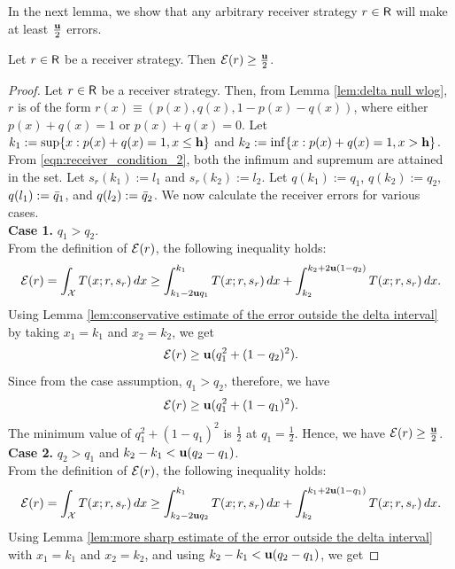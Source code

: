 In the next lemma, we show that any arbitrary receiver strategy $r \in \mathsf{R}$ will make at least $\frac{\mathbf{u}}{2}$ errors.

\begin{lem}\label{lem:Error more than half}
    Let $r \in \mathsf{R}$ be a receiver strategy. Then $\mathcal{E}(r) \geq \frac{\mathbf{u}}{2}$.
\end{lem}
\begin{proof}\label{proof:Error more than half}
    Let $r \in \mathsf{R}$ be a receiver strategy. Then, from Lemma \ref{lem:delta null wlog}, $r$ is of the form $r(x) \equiv (p(x), q(x), 1 - p(x) - q(x))$, where either $p(x) + q(x) = 1$ or $p(x) + q(x) = 0$. Let $k_1 := \sup\{x : p(x) + q(x) = 1, x \leq \mathbf{h}\}$ and $k_2 := \inf\{x : p(x) + q(x) = 1, x > \mathbf{h}\}$. From \eqref{eqn:receiver_condition_2}, both the infimum and supremum are attained in the set. Let $s_r(k_1) := l_1$ and $s_r(k_2) := l_2$. Let $q(k_1) := q_1$, $q(k_2) := q_2$, $q(l_1) := \bar{q}_1$, and $q(l_2) := \bar{q}_2$. We now calculate the receiver errors for various cases.\\
    \textbf{Case 1. }{$q_1 > q_2$.} \\
        From the definition of $\mathcal{E}(r)$, the following inequality holds:
        \[
        \mathcal{E}(r) = \int_{\mathcal{X}} T(x; r, s_r) \, dx \geq \int_{k_1 - 2\mathbf{u} q_1}^{k_1} T(x; r, s_r) \, dx + \int_{k_2}^{k_2 + 2\mathbf{u}(1 - q_2)} T(x; r, s_r) \, dx.
        \]
        Using Lemma \ref{lem:conservative estimate of the error outside the delta interval} by taking $x_1 = k_1$ and $x_2 = k_2$, we get
        \[
        \mathcal{E}(r) \geq \mathbf{u}(q_1^2 + (1 - q_2)^2).
        \]
        Since from the case assumption, $q_1 > q_2$, therefore, we have
        \[
        \mathcal{E}(r) \geq \mathbf{u}(q_1^2 + (1 - q_1)^2).
        \]
        The minimum value of $q_1^2 + (1 - q_1)^2$ is $\frac{1}{2}$ at $q_1 = \frac{1}{2}$. Hence, we have $\mathcal{E}(r) \geq \frac{\mathbf{u}}{2}$.\\
\textbf{Case 2. }{$q_2 > q_1$ and $k_2 - k_1 < \mathbf{u}(q_2 - q_1)$.} \\
        From the definition of $\mathcal{E}(r)$, the following inequality holds:
        \begin{equation}\label{lem:eqn:lower bound on error from outside}
            \mathcal{E}(r) = \int_{\mathcal{X}} T(x; r, s_r) \, dx \geq \int_{k_2 - 2\mathbf{u} q_2}^{k_1} T(x; r, s_r) \, dx + \int_{k_2}^{k_1 + 2\mathbf{u} (1 - q_1)} T(x; r, s_r) \, dx.
        \end{equation}
        Using Lemma \ref{lem:more sharp estimate of the error outside the delta interval} with $x_1 = k_1$ and $x_2 = k_2$, and using $k_2 - k_1 < \mathbf{u}(q_2 - q_1)$, we get

\end{proof}

